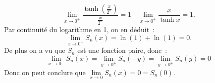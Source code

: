 \begin{corrige}
\begin{enumerate}
\begin{enumerate}
\begin{equation*}
                        \lim\limits_{x \to 0^+} \frac{\tanh\left(\frac{x}{2^n}\right)}{\frac{x}{2^n}} = 1 \quad \lim\limits_{x \to 0^+} \frac{x}{\tanh x} = 1.
                    \end{equation*}
                    Par continuité du logarithme en 1, on en déduit~:
                    \begin{equation*}
                        \lim\limits_{x \to 0^+} S_n(x) = \ln(1) + \ln(1) = 0.
                    \end{equation*}
                    De plus on a vu que \(S_n\) est une fonction paire, donc~:
                    \begin{equation*}
                        \lim\limits_{x \to 0^-} S_n(x) = \lim\limits_{y \to 0^+} S_n(-y) = \lim\limits_{y \to 0^+} S_n(y) = 0 
                    \end{equation*}
                    Donc on peut conclure que \(\lim\limits_{x \to 0} S_n(x) = 0 = S_n(0)\).
            \end{enumerate}
    \end{enumerate}
\end{corrige}


